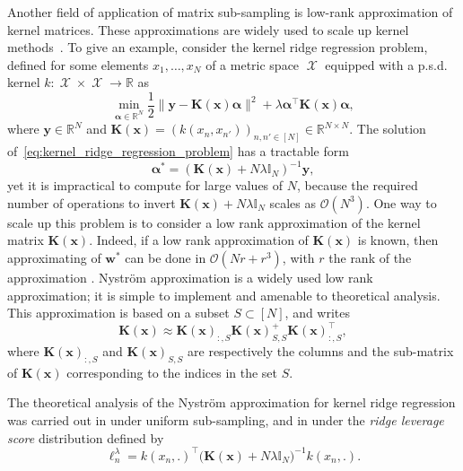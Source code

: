 \documentclass[twoside,11pt]{book}
\numberwithin{theorem}{chapter}
\numberwithin{definition}{chapter}
\numberwithin{proposition}{chapter}
\numberwithin{corollary}{chapter}
\numberwithin{example}{chapter}
\numberwithin{lemma}{chapter}
\numberwithin{assumption}{chapter}
\numberwithin{equation}{chapter}
\numberwithin{figure}{chapter}
\DeclareMathOperator{\Tran}{\intercal}
\DeclareMathOperator{\X}{\mathcal{X}}
\begin{document}
Another field of application of matrix sub-sampling is low-rank approximation of kernel matrices. These approximations are widely used to scale up kernel methods~\citep{ScSm18,ShCr04}. To give an example, consider the kernel ridge regression problem, defined for
  some elements $x_{1}, \dots, x_{N}$ of a metric space $\X$ equipped with a p.s.d. kernel $k: \X \times \X \rightarrow \mathbb{R}$ as
\begin{equation}\label{eq:kernel_ridge_regression_problem}
\min\limits_{\bm{\alpha} \in \mathbb{R}^{N}} \frac{1}{2}\|\bm{y} - \bm{K}(\bm{x}) \bm{\alpha}\|^{2} + \lambda \bm{\alpha}^{\Tran} \bm{K}(\bm{x}) \bm{\alpha},
\end{equation}
where $\bm{y} \in \mathbb{R}^{N}$ and $\bm{K}(\bm{x}) = (k(x_{n},x_{n'}))_{n,n' \in [N]} \in \mathbb{R}^{N \times N}$.
The solution of~\eqref{eq:kernel_ridge_regression_problem} has a tractable form
\begin{equation}
\bm{\alpha}^{*} = (\bm{K}(\bm{x}) +N\lambda \mathbb{I}_{N})^{-1} \bm{y},
\end{equation}
yet it is impractical to compute for large values of $N$, because the required number of operations to invert $\bm{K}(\bm{x}) +N\lambda \mathbb{I}_{N}$ scales as $\mathcal{O}(N^{3})$. One way to scale up this problem is to consider a low rank approximation of the kernel matrix $\bm{K}(\bm{x})$. Indeed, if a low rank approximation of $\bm{K}(\bm{x})$ is known, then approximating of $\bm{w}^{*}$ can be done in $\mathcal{O}(Nr + r^{3})$, with $r$ the rank of the approximation \citep{SmSc00,WiSe01}. Nystr{\"o}m approximation is a widely used low rank approximation; it is simple to implement and amenable to theoretical analysis. This approximation is based on a subset $S \subset [N]$, and writes
\begin{equation}
\bm{K}(\bm{x}) \approx \bm{K}(\bm{x})_{:,S} \bm{K}(\bm{x})_{S,S}^{+} \bm{K}(\bm{x})_{:,S}^{\Tran},
\end{equation}
where $\bm{K}(\bm{x})_{:,S}$ and $\bm{K}(\bm{x})_{S,S}$ are respectively the columns and the sub-matrix of $\bm{K}(\bm{x})$ corresponding to the indices in the set $S$.

The theoretical analysis of the Nystr{\"o}m approximation for kernel ridge regression was carried out in \citep{Bac13} under uniform sub-sampling, and in \citep{AlMa15} under the 
\emph{ridge leverage score} distribution defined by
\begin{equation}\label{eq:introduction_rlv_score}
\ell^{\lambda}_{n} = k(x_{n},.)^{\Tran} \big( \bm{K}(\bm{x}) + N \lambda \mathbb{I}_{N} \big)^{-1}k(x_{n},.).
\end{equation}
\end{document}

